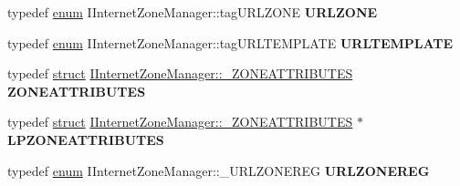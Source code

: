 \begin{DoxyCompactItemize}
\mbox{\label{interface_i_internet_zone_manager_a8cb5cd322d621d0a19ff19ee7d31b799}} 
typedef \hyperlink{interfaceenum}{enum} I\+Internet\+Zone\+Manager\+::tag\+U\+R\+L\+Z\+O\+NE {\bfseries U\+R\+L\+Z\+O\+NE}
\item 
\mbox{\label{interface_i_internet_zone_manager_a487ce9870871af519d83a6e9fc2bd226}} 
typedef \hyperlink{interfaceenum}{enum} I\+Internet\+Zone\+Manager\+::tag\+U\+R\+L\+T\+E\+M\+P\+L\+A\+TE {\bfseries U\+R\+L\+T\+E\+M\+P\+L\+A\+TE}
\item 
\mbox{\label{interface_i_internet_zone_manager_a23a264de2024f8b0bd5b89b07c993c62}} 
typedef \hyperlink{interfacestruct}{struct} \hyperlink{struct_i_internet_zone_manager_1_1___z_o_n_e_a_t_t_r_i_b_u_t_e_s}{I\+Internet\+Zone\+Manager\+::\+\_\+\+Z\+O\+N\+E\+A\+T\+T\+R\+I\+B\+U\+T\+ES} {\bfseries Z\+O\+N\+E\+A\+T\+T\+R\+I\+B\+U\+T\+ES}
\item 
\mbox{\label{interface_i_internet_zone_manager_a48718b334faf04e761b478f9bcd3f32c}} 
typedef \hyperlink{interfacestruct}{struct} \hyperlink{struct_i_internet_zone_manager_1_1___z_o_n_e_a_t_t_r_i_b_u_t_e_s}{I\+Internet\+Zone\+Manager\+::\+\_\+\+Z\+O\+N\+E\+A\+T\+T\+R\+I\+B\+U\+T\+ES} $\ast$ {\bfseries L\+P\+Z\+O\+N\+E\+A\+T\+T\+R\+I\+B\+U\+T\+ES}
\item 
\mbox{\label{interface_i_internet_zone_manager_aff2cdd6a42c28225a79376c377c7553d}} 
typedef \hyperlink{interfaceenum}{enum} I\+Internet\+Zone\+Manager\+::\+\_\+\+U\+R\+L\+Z\+O\+N\+E\+R\+EG {\bfseries U\+R\+L\+Z\+O\+N\+E\+R\+EG}
\end{DoxyCompactItemize}
